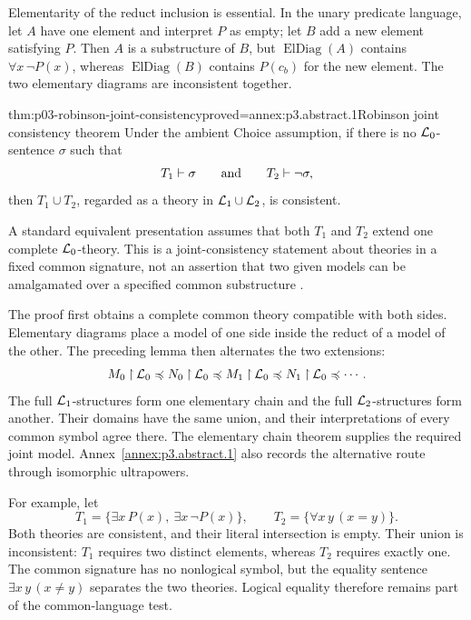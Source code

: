Elementarity of the reduct inclusion is essential.  In the unary
predicate language, let \(A\) have one element and interpret \(P\)
as empty; let \(B\) add a new element satisfying \(P\).
Then \(A\) is a substructure of \(B\), but
\(\operatorname{ElDiag}(A)\) contains \(\forall x\,\neg P(x)\),
whereas \(\operatorname{ElDiag}(B)\) contains \(P(c_b)\) for the new
element.  The two elementary diagrams are inconsistent together.

\begin{hbtheorem}{thm:p03-robinson-joint-consistency}{proved=annex:p3.abstract.1}{Robinson joint consistency theorem}
Under the ambient Choice assumption, if there is no
\(\mathcal{L}_0\)-sentence \(\sigma\) such that
\[
 T_1\vdash\sigma
 \qquad\text{and}\qquad
 T_2\vdash\neg\sigma,
\]
then \(T_1\cup T_2\), regarded as a theory in
\(\mathcal{L}_1\cup\mathcal{L}_2\), is consistent.
\end{hbtheorem}

A standard equivalent presentation assumes that both \(T_1\) and \(T_2\)
extend one complete \(\mathcal{L}_0\)-theory.  This is a joint-consistency statement
about theories in a fixed common signature, not an assertion that two given
models can be amalgamated over a specified common substructure
\cite{RobinsonJointConsistency1956}.

The proof first obtains a complete common theory compatible with both
sides.  Elementary diagrams place a model of one side inside the reduct
of a model of the other.  The preceding lemma then alternates the two
extensions:
\[
 M_0\mathbin{\upharpoonright}\mathcal{L}_0\preccurlyeq N_0\mathbin{\upharpoonright}\mathcal{L}_0
 \preccurlyeq M_1\mathbin{\upharpoonright}\mathcal{L}_0\preccurlyeq N_1\mathbin{\upharpoonright}\mathcal{L}_0
 \preccurlyeq\cdots .
\]
The full \(\mathcal{L}_1\)-structures form one elementary chain and the full
\(\mathcal{L}_2\)-structures form another.  Their domains have the same union,
and their interpretations of every common symbol agree there.
The elementary chain theorem supplies the required joint model.
Annex~\ref{annex:p3.abstract.1} also records the alternative route
through isomorphic ultrapowers.

For example, let
\[
 T_1=\{\exists x\,P(x),\ \exists x\,\neg P(x)\},
 \qquad T_2=\{\forall x\,y\,(x=y)\}.
\]
Both theories are consistent, and their literal intersection is empty.
Their union is inconsistent: \(T_1\) requires two distinct elements,
whereas \(T_2\) requires exactly one.
The common signature has no nonlogical symbol, but the equality sentence
\(\exists x\,y\,(x\ne y)\) separates the two theories.
Logical equality therefore remains part of the common-language test.


